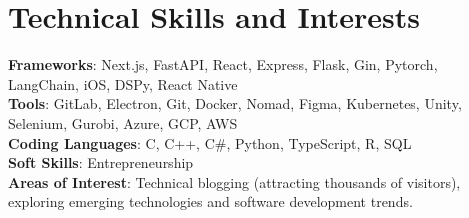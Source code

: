 \documentclass[a4paper,11pt]{article}
\begin{document}
\section{\textbf{Technical Skills and Interests}}
\begin{itemize}[leftmargin=0.05in, label={}]
  \small{\item{
                \textbf{Frameworks}{: Next.js, FastAPI, React, Express, Flask, Gin, Pytorch, LangChain, iOS, DSPy, React Native} \\
                \textbf{Tools}{: GitLab, Electron, Git, Docker, Nomad, Figma, Kubernetes, Unity, Selenium, Gurobi, Azure, GCP, AWS} \\
                \textbf{Coding Languages}{: C, C++, C\#, Python, TypeScript, R, SQL} \\
                \textbf{Soft Skills}{: Entrepreneurship} \\
                \textbf{Areas of Interest}{: Technical blogging (attracting thousands of visitors), exploring emerging technologies and software development trends.} \\
          }}
\end{itemize}
\vspace{-16pt}
\end{document}
